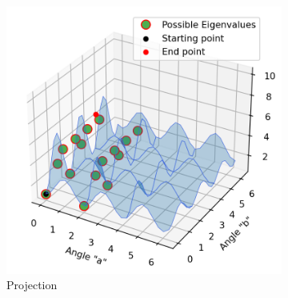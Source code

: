 \documentclass[
  letterpaper,
  DIV=11,
  numbers=noendperiod]{scrartcl}
\begin{document}
\begin{figure}
\begin{minipage}{0.33\linewidth}
\begin{figure}[H]
{\includegraphics{Projection_2D.png}

}

\caption{\label{fig-hanno}Projection}

\end{figure}%

\end{minipage}%
%
\begin{minipage}{0.33\linewidth}

\begin{figure}[H]

\end{figure}
\end{minipage}
\end{figure}
\end{document}
